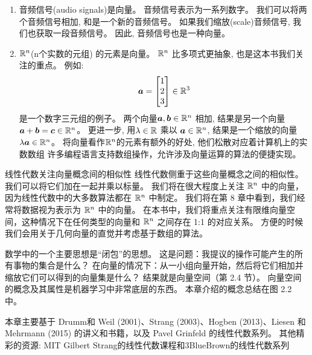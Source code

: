 \begin{enumerate}
    \item 音频信号(audio signals)是向量。
    音频信号表示为一系列数字。
    我们可以将两个音频信号相加, 和是一个新的音频信号。
    如果我们缩放(scale)音频信号, 我们也获取一段音频信号。
    因此, 音频信号也是一种向量。

    \item $\mathbb{R}^n$(n个实数的元组) 的元素是向量。
    $\mathbb{R}^n$ 比多项式更抽象, 也是这本书我们关注的重点。 例如:
    \begin{equation}
        \boldsymbol{a} =
        \begin{bmatrix}
            1 \\ 2 \\ 3
        \end{bmatrix}
        \in \mathbb{R}^3
    \end{equation}
    是一个数字三元组的例子。
    两个向量$\boldsymbol{a} , \boldsymbol{b} \in \mathbb{R}^n$ 相加,
    结果是另一个向量$\boldsymbol{a} + \boldsymbol{b} = \boldsymbol{c} \in \mathbb{R}^n$。
    更进一步, 用$\lambda \in \mathbb{R}$ 乘以 $\boldsymbol{a} \in \mathbb{R}^n$,
    结果是一个缩放的向量 $\lambda \boldsymbol{a} \in \mathbb{R}^n$。
    将向量看作$\mathbb{R}^n$的元素有额外的好处, 他们松散对应着计算机上的实数数组
    许多编程语言支持数组操作，允许涉及向量运算的算法的便捷实现。
\end{enumerate}

线性代数关注向量概念间的相似性
线性代数侧重于这些向量概念之间的相似性。
我们可以将它们加在一起并乘以标量。
我们将在很大程度上关注 $\mathbb{R}^n$ 中的向量，因为线性代数中的大多数算法都在 $\mathbb{R}^n$ 中制定。
我们将在第 8 章中看到，我们经常将数据视为表示为 $\mathbb{R}^n$ 中的向量。
在本书中，我们将重点关注有限维向量空间，这种情况下在任何类型的向量和 $\mathbb{R}^n$ 之间存在 1:1 的对应关系。
方便的时候我们会用关于几何向量的直觉并考虑基于数组的算法。

数学中的一个主要思想是“闭包”的思想。
这是问题：我提议的操作可能产生的所有事物的集合是什么？
在向量的情况下：从一小组向量开始，然后将它们相加并缩放它们可以得到的向量集是什么？
结果就是向量空间（第 2.4 节）。
向量空间的概念及其属性是机器学习中非常底层的东西。
本章介绍的概念总结在图 2.2 中。

本章主要基于 Drumm和 Weil (2001)、Strang (2003)、Hogben (2013)、Liesen 和 Mehrmann (2015) 的讲义和书籍，以及 Pavel Grinfeld 的线性代数系列。
其他精彩的资源: MIT Gilbert Strang的线性代数课程和3BlueBrown的线性代数系列

